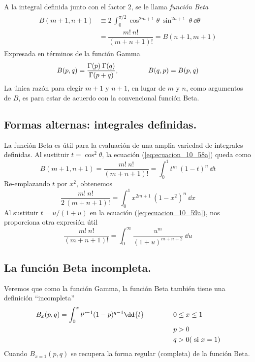 A la integral definida junto con el factor $2$, se le llama \emph{función Beta}
\begin{align}
\begin{aligned}
B(m+1, n+1) &\equiv 2 \: \int_{0}^{\pi/2} \cos^{2m+1} \theta \: \sin^{2n+1} \: \theta \: \dd{\theta} \\
&= \dfrac{m! \: n!}{(m+n+1)!} = B(n+1, m+1)
\label{eq:ecuacion_10_58a}
\end{aligned}
\end{align}
Expresada en términos de la función Gamma
\begin{equation}
B(p, q) = \dfrac{\Gamma(p) \: \Gamma(q)}{\Gamma(p+q)}, \hspace{1.5cm} B(q, p) = B(p, q)
\label{eq:ecuacion_10_58b}
\end{equation}
La única razón para elegir $m + 1$ y $n + 1$, en lugar de $m$ y $n$, como argumentos de $B$, es para estar de acuerdo con la convencional función Beta.
\subsection{Formas alternas: integrales definidas.}
La función Beta es útil para la evaluación de una amplia variedad de integrales definidas. Al sustituir $t= \cos^{2} \theta$, la ecuación (\ref{eq:ecuacion_10_58a}) queda como
\begin{equation}
B(m+1, n+1) = \dfrac{m! \: n!}{(m+n+1)!} = \int_{0}^{1} t^{m} \: (1 - t)^{n} \: \dd{t}
\label{eq:ecuacion_10_59a}
\end{equation}
Re-emplazando $t$ por $x^{2}$, obtenemos
\begin{equation}
\dfrac{m! \: n!}{2 \, (m+n+1)!} = \int_{0}^{1} x^{2m+1} \: (1-x^{2})^{n} \: \dd{x}
\label{eq:ecuacion_10_59b}
\end{equation}
Al sustituir $t= u/(1+u)$ en la ecuación (\ref{eq:ecuacion_10_59a}), nos proporciona otra expresión útil
\begin{equation}
\dfrac{m! \: n!}{(m+n+1)!} = \int_{0}^{\infty} \dfrac{u^{m}}{(1+u)^{m+n+2}} \: \dd{u}
\label{eq:ecuacion_10_60}
\end{equation}
\subsection{La función Beta incompleta.}
Veremos que como la función Gamma, la función Beta también tiene una definición \enquote{incompleta}
\begin{align}
\begin{aligned}
B_{x}(p,q) = \int_{0}^{x} t^{p-1} (1-p)^{q-1} \dd{t} \hspace{1.5cm} & 0 \leq x \leq 1 \\
& p > 0 \\
& q > 0 (\text{ si } x=1)
\label{eq:ecuacion_10_67}
\end{aligned}
\end{align}
Cuando $B_{x=1}(p,q)$ se recupera la forma regular (completa) de la función Beta.
